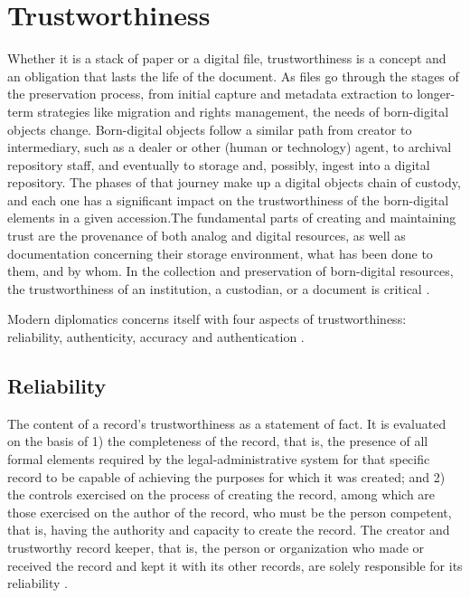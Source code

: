 \documentclass[final]{vutinfth}
\begin{document}
\section{Trustworthiness}
Whether it is a stack of paper or a digital file, trustworthiness is a concept and an obligation that lasts the life of the document. As files go through the stages of the preservation process, from initial capture and metadata extraction to longer-term strategies like migration and rights management, the needs of born-digital objects change. Born-digital objects follow a similar path from creator to intermediary, such as a dealer or other (human or technology) agent, to archival repository staff, and eventually to storage and, possibly, ingest into a digital repository. The phases of that journey make up a digital objects chain of custody, and each one has a significant impact on the trustworthiness of the born-digital elements in a given accession.\newline The fundamental parts of creating and maintaining trust are the provenance of both analog and digital resources, as well as documentation concerning their storage environment, what has been done to them, and by whom. In the collection and preservation of born-digital resources, the trustworthiness of an institution, a custodian, or a document is critical \cite[27]{kirschenbaum2010digital}. 

Modern diplomatics concerns itself with four aspects of trustworthiness: reliability, authenticity, accuracy and authentication \cite[10]{kirschenbaum2010digital}.

\subsection{Reliability}
The content of a record's trustworthiness as a statement of fact. It is evaluated on the basis of 1) the completeness of the record, that is, the presence of all formal elements required by the legal-administrative system for that specific record to be capable of achieving the purposes for which it was created; and 2) the controls exercised on the process of creating the record, among which are those exercised on the author of the record, who must be the person competent, that is, having the authority and capacity to create the record.
The creator and trustworthy record keeper, that is, the person or organization who made or received the record and kept it with its other records, are solely responsible for its reliability \cite[52]{duranti2009digital}.
\end{document}
